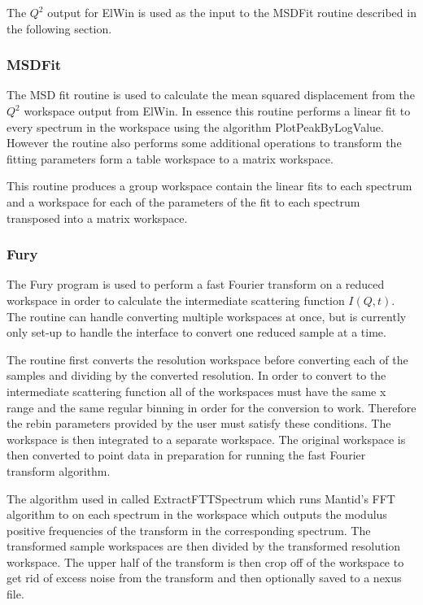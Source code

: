 \documentclass[paper=a4, fontsize=11pt]{scrartcl}	%
\numberwithin{equation}{section}															%
\numberwithin{figure}{section}																%
\numberwithin{table}{section}																%
\begin{document}
The $Q^2$ output for ElWin is used as the input to the MSDFit routine described in the following section.

\subsubsection{MSDFit}
The MSD fit routine is used to calculate the mean squared displacement from the $Q^2$ workspace output from ElWin. In essence this routine performs a linear fit to every spectrum in the workspace using the algorithm PlotPeakByLogValue. However the routine also performs some additional operations to transform the fitting parameters form a table workspace to a matrix workspace.

This routine produces a group workspace contain the linear fits to each spectrum and a workspace for each of the parameters of the fit to each spectrum transposed into a matrix workspace.

\subsubsection{Fury}
The Fury program is used to perform a fast Fourier transform on a reduced workspace in order to calculate the intermediate scattering function $I(Q,t)$. The routine can handle converting multiple workspaces at once, but is currently only set-up to handle the interface to convert one reduced sample at a time.

The routine first converts the resolution workspace before converting each of the samples and dividing by the converted resolution. In order to convert to the intermediate scattering function all of the workspaces must have the same x range and the same regular binning in order for the conversion to work. Therefore the rebin parameters provided by the user must satisfy these conditions. The workspace is then integrated to a separate workspace. The original workspace is then converted to point data in preparation for running the fast Fourier transform algorithm.

The algorithm used in called ExtractFTTSpectrum which runs Mantid's FFT algorithm to on each spectrum in the workspace which outputs the modulus positive frequencies of the transform in the corresponding spectrum. The transformed sample workspaces are then divided by the transformed resolution workspace. The upper half of the transform is then crop off of the workspace to get rid of excess noise from the transform and then optionally saved to a nexus file.
\end{document}
